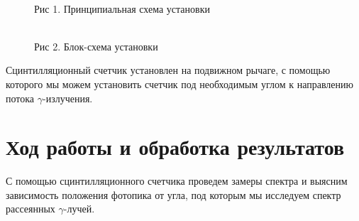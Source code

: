 \documentclass[12pt]{article}
\begin{document}
    \begin{figure}[h!]
      \begin{minipage}[t]{0.49\linewidth}
        \\
        Рис 1. Принципиальная схема установки
        \label{fig:scheme}
      \end{minipage}
      \begin{minipage}[t]{0.49\linewidth}
        \\
        Рис 2. Блок-схема установки
        \label{fig:block_scheme}
      \end{minipage}
    \end{figure}

    Сцинтилляционный счетчик установлен на подвижном рычаге, с помощью которого
    мы можем установить счетчик под необходимым углом к направлению потока
    $\gamma$-излучения.

  \section{Ход работы и обработка результатов}

    С помощью сцинтилляционного счетчика проведем замеры спектра и выясним
    зависимость положения фотопика от угла, под которым мы исследуем спектр
    рассеянных $\gamma$-лучей.
\end{document}
